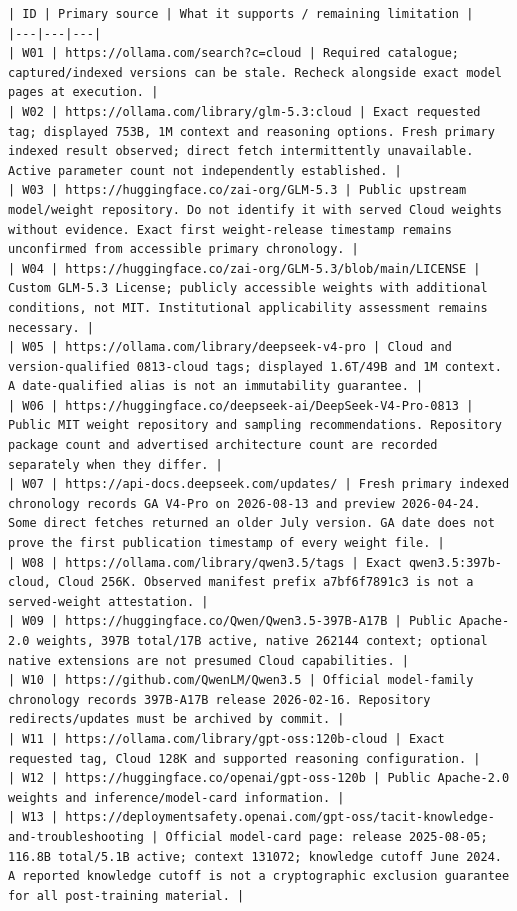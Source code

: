 \documentclass[11pt,a4paper]{article}
\begin{document}
\begin{verbatim}
| ID | Primary source | What it supports / remaining limitation |
|---|---|---|
| W01 | https://ollama.com/search?c=cloud | Required catalogue; captured/indexed versions can be stale. Recheck alongside exact model pages at execution. |
| W02 | https://ollama.com/library/glm-5.3:cloud | Exact requested tag; displayed 753B, 1M context and reasoning options. Fresh primary indexed result observed; direct fetch intermittently unavailable. Active parameter count not independently established. |
| W03 | https://huggingface.co/zai-org/GLM-5.3 | Public upstream model/weight repository. Do not identify it with served Cloud weights without evidence. Exact first weight-release timestamp remains unconfirmed from accessible primary chronology. |
| W04 | https://huggingface.co/zai-org/GLM-5.3/blob/main/LICENSE | Custom GLM-5.3 License; publicly accessible weights with additional conditions, not MIT. Institutional applicability assessment remains necessary. |
| W05 | https://ollama.com/library/deepseek-v4-pro | Cloud and version-qualified 0813-cloud tags; displayed 1.6T/49B and 1M context. A date-qualified alias is not an immutability guarantee. |
| W06 | https://huggingface.co/deepseek-ai/DeepSeek-V4-Pro-0813 | Public MIT weight repository and sampling recommendations. Repository package count and advertised architecture count are recorded separately when they differ. |
| W07 | https://api-docs.deepseek.com/updates/ | Fresh primary indexed chronology records GA V4-Pro on 2026-08-13 and preview 2026-04-24. Some direct fetches returned an older July version. GA date does not prove the first publication timestamp of every weight file. |
| W08 | https://ollama.com/library/qwen3.5/tags | Exact qwen3.5:397b-cloud, Cloud 256K. Observed manifest prefix a7bf6f7891c3 is not a served-weight attestation. |
| W09 | https://huggingface.co/Qwen/Qwen3.5-397B-A17B | Public Apache-2.0 weights, 397B total/17B active, native 262144 context; optional native extensions are not presumed Cloud capabilities. |
| W10 | https://github.com/QwenLM/Qwen3.5 | Official model-family chronology records 397B-A17B release 2026-02-16. Repository redirects/updates must be archived by commit. |
| W11 | https://ollama.com/library/gpt-oss:120b-cloud | Exact requested tag, Cloud 128K and supported reasoning configuration. |
| W12 | https://huggingface.co/openai/gpt-oss-120b | Public Apache-2.0 weights and inference/model-card information. |
| W13 | https://deploymentsafety.openai.com/gpt-oss/tacit-knowledge-and-troubleshooting | Official model-card page: release 2025-08-05; 116.8B total/5.1B active; context 131072; knowledge cutoff June 2024. A reported knowledge cutoff is not a cryptographic exclusion guarantee for all post-training material. |

\end{verbatim}
\end{document}
